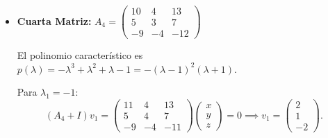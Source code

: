 {\begin{itemize}
        Para $\lambda_2 = -1$:
        \[
            (A_3 + I)v = 0 \implies \begin{pmatrix} 1 & 1 & 1 \\ 1 & 1 & 1 \\ 1 & 1 & 1 \end{pmatrix}\begin{pmatrix} x \\ y \\ z \end{pmatrix} = 0 \implies x + y + z = 0.
        \]
        Tomamos dos vectores linealmente independientes que cumplan la ecuación, por ejemplo, $v_2 = \begin{pmatrix} -1 \\ 1 \\ 0 \end{pmatrix}$ y $v_3 = \begin{pmatrix} -1 \\ 0 \\ 1 \end{pmatrix}$.
        
        Dado que todos los autovalores y autovectores son puramente reales, las soluciones complejas y reales son idénticas. La \textbf{solución general} es:
        \[
            u(t) = C_1 e^{2t} \begin{pmatrix} 1 \\ 1 \\ 1 \end{pmatrix} + C_2 e^{-t} \begin{pmatrix} -1 \\ 1 \\ 0 \end{pmatrix} + C_3 e^{-t} \begin{pmatrix} -1 \\ 0 \\ 1 \end{pmatrix}, \quad C_1, C_2, C_3 \in \mathbb{K}.
        \]
        \item \textbf{Cuarta Matriz:} $A_4 = \begin{pmatrix} 10 & 4 & 13 \\ 5 & 3 & 7 \\ -9 & -4 & -12 \end{pmatrix}$
    
        El polinomio característico es $p(\lambda) = -\lambda^3 + \lambda^2 + \lambda - 1 = -(\lambda-1)^2(\lambda+1)$.
        
        Para $\lambda_1 = -1$:
        \[
            (A_4 + I)v_1 = \begin{pmatrix} 11 & 4 & 13 \\ 5 & 4 & 7 \\ -9 & -4 & -11 \end{pmatrix}\begin{pmatrix} x \\ y \\ z \end{pmatrix} = 0 \implies v_1 = \begin{pmatrix} 2 \\ 1 \\ -2 \end{pmatrix}.
        \]
        

\end{itemize}}
